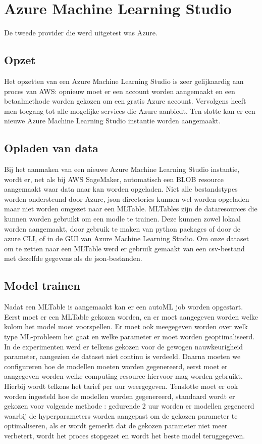 \section{Azure Machine Learning Studio}
De tweede provider die werd uitgetest was Azure.
\subsection{Opzet}
Het opzetten van een Azure Machine Learning Studio is zeer gelijkaardig aan proces van AWS: opnieuw moet er een account worden aangemaakt en een betaalmethode worden gekozen om een gratis Azure account. Vervolgens heeft men toegang tot alle mogelijke services die Azure aanbiedt. Ten slotte kan er een nieuwe Azure Machine Learning Studio instantie worden aangemaakt. 
\subsection{Opladen van data}
Bij het aanmaken van een nieuwe Azure Machine Learning Studio instantie, wordt er, net als bij AWS SageMaker, automatisch een BLOB resource aangemaakt waar data naar kan worden opgeladen. Niet alle bestandstypes worden ondersteund door Azure, json-directories kunnen wel worden opgeladen maar niet worden omgezet naar een MLTable. MLTables zijn de dataresources die kunnen worden gebruikt om een modle te trainen. Deze kunnen zowel lokaal worden aangemaakt, door gebruik te maken van python packages of door de azure CLI, of in de GUI van Azure Machine Learning Studio. Om onze dataset om te zetten naar een MLTable werd er gebruik gemaakt van een csv-bestand met dezelfde gegevens als de json-bestanden. 
\subsection{Model trainen}
Nadat een MLTable is aangemaakt kan er een autoML job worden opgestart. Eerst moet er een MLTable gekozen worden, en er moet aangegeven worden welke kolom het model moet voorspellen. Er moet ook meegegeven worden over welk type ML-probleem het gaat en welke parameter er moet worden geoptimaliseerd. In de experimenten werd er telkens gekozen voor de gewogen nauwkeurigheid parameter, aangezien de dataset niet continu is verdeeld. Daarna moeten we configureren hoe de modellen moeten worden gegenereerd, eerst moet er aangegeven worden welke computing resource hiervoor mag worden gebruikt. Hierbij wordt telkens het tarief per uur weergegeven. Tenslotte moet er ook worden ingesteld hoe de modellen worden gegenereerd, standaard wordt er gekozen voor volgende methode : gedurende 2 uur worden er modellen gegeneerd waarbij de hyperparameters worden aangepast om de gekozen parameter te optimaliseren, als er wordt gemerkt dat de gekozen parameter niet meer verbetert, wordt het proces stopgezet en wordt het beste model teruggegeven. 
